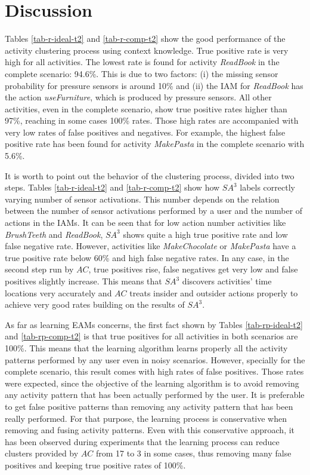 \section{Discussion}
\label{sec:evaluation:discussion}

Tables \ref{tab-r-ideal-t2} and \ref{tab-r-comp-t2} show the good performance of the activity clustering process using context knowledge. True positive rate is very high for all activities. The lowest rate is found for activity \textit{ReadBook} in the complete scenario: 94.6\%. This is due to two factors: (i) the missing sensor probability for pressure sensors is around 10\% and (ii) the IAM for \textit{ReadBook} has the action \textit{useFurniture}, which is produced by pressure sensors. All other activities, even in the complete scenario, show true positive rates higher than 97\%, reaching in some cases 100\% rates. Those high rates are accompanied with very low rates of false positives and negatives. For example, the highest false positive rate has been found for activity \textit{MakePasta} in the complete scenario with 5.6\%. 

It is worth to point out the behavior of the clustering process, divided into two steps. Tables \ref{tab-r-ideal-t2} and \ref{tab-r-comp-t2} show how $SA^3$ labels correctly varying number of sensor activations. This number depends on the relation between the number of sensor activations performed by a user and the number of actions in the IAMs. It can be seen that for low action number activities like \textit{BrushTeeth} and \textit{ReadBook}, $SA^3$ shows quite a high true positive rate and low false negative rate. However, activities like \textit{MakeChocolate} or \textit{MakePasta} have a true positive rate below 60\% and high false negative rates. In any case, in the second step run by $AC$, true positives rise, false negatives get very low and false positives slightly increase. This means that $SA^3$ discovers activities' time locations very accurately and $AC$ treats insider and outsider actions properly to achieve very good rates building on the results of $SA^3$.

As far as learning EAMs concerns, the first fact shown by Tables \ref{tab-rp-ideal-t2} and \ref{tab-rp-comp-t2} is that true positives for all activities in both scenarios are 100\%. This means that the learning algorithm learns properly all the activity patterns performed by any user even in noisy scenarios. However, specially for the complete scenario, this result comes with high rates of false positives. Those rates were expected, since the objective of the learning algorithm is to avoid removing any activity pattern that has been actually performed by the user. It is preferable to get false positive patterns than removing any activity pattern that has been really performed. For that purpose, the learning process is conservative when removing and fusing activity patterns. Even with this conservative approach, it has been observed during experiments that the learning process can reduce clusters provided by $AC$ from 17 to 3 in some cases, thus removing many false positives and keeping true positive rates of 100\%. 

